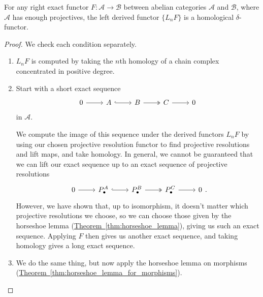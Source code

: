 \documentclass[main.tex]{subfiles}
\begin{document}
\begin{theorem}
  For any right exact functor $F\colon \mathcal{A} \to \mathcal{B}$ between abelian categories $\mathcal{A}$ and $\mathcal{B}$, where $\mathcal{A}$ has enough projectives, the left derived functor $\{L_{n}F\}$ is a homological $\delta$-functor.
\end{theorem}
\begin{proof}
  We check each condition separately.
  \begin{enumerate}
    \item $L_{n}F$ is computed by taking the $n$th homology of a chain complex concentrated in positive degree.

    \item Start with a short exact sequence
      \begin{equation*}
        \begin{tikzcd}
          0
          \arrow[r]
          & A
          \arrow[r, hook]
          & B
          \arrow[r, two heads]
          & C
          \arrow[r]
          & 0
        \end{tikzcd}
      \end{equation*}
      in $\mathcal{A}$.

      We compute the image of this sequence under the derived functors $L_{n}F$ by using our chosen projective resolution functor to find projective resolutions and lift maps, and take homology. In general, we cannot be guaranteed that we can lift our exact sequence up to an exact sequence of projective resolutions
      \begin{equation*}
        \begin{tikzcd}
          0
          \arrow[r]
          & P^{A}_{\bullet}
          \arrow[r, hook]
          & P^{B}_{\bullet}
          \arrow[r, two heads]
          & P^{C}_{\bullet}
          \arrow[r]
          & 0
        \end{tikzcd}.
      \end{equation*}
      However, we have shown that, up to isomorphism, it doesn't matter which projective resolutions we choose, so we can choose those given by the horseshoe lemma (\hyperref[thm:horseshoe_lemma]{Theorem~\ref*{thm:horseshoe_lemma}}), giving us such an exact sequence. Applying $F$ then gives us another exact sequence, and taking homology gives a long exact sequence.

    \item We do the same thing, but now apply the horseshoe lemma on morphisms (\hyperref[thm:horseshoe_lemma_for_morphisms]{Theorem~\ref*{thm:horseshoe_lemma_for_morphisms}}).
  \end{enumerate}
\end{proof}
\end{document}
